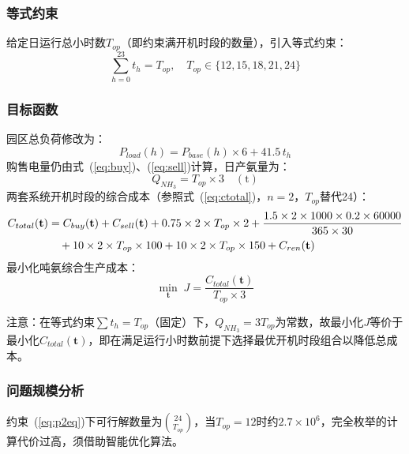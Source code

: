 \documentclass[UTF8,12pt,a4paper]{ctexart}
\begin{document}
\subsubsection{等式约束}

给定日运行总小时数$T_{op}$（即约束满开机时段的数量），引入等式约束：
\begin{equation}
  \sum_{h=0}^{23} t_h = T_{op},\quad T_{op}\in\{12,15,18,21,24\}
  \label{eq:p2eq}
\end{equation}

\subsubsection{目标函数}

园区总负荷修改为：
\begin{equation}
  P_{load}(h) = P_{base}(h)\times 6 + 41.5\,t_h
  \label{eq:load2}
\end{equation}
购售电量仍由式~(\ref{eq:buy})、(\ref{eq:sell})计算，日产氨量为：
\begin{equation}
  Q_{NH_3} = T_{op}\times 3 \quad(\text{t})
  \label{eq:qnh3}
\end{equation}
两套系统开机时段的综合成本（参照式~(\ref{eq:ctotal})，$n=2$，$T_{op}$替代24）：
\begin{align}
  C_{total}(\mathbf{t}) &= C_{buy}(\mathbf{t}) + C_{sell}(\mathbf{t})
    + 0.75\times2\times T_{op}\times2
    + \frac{1.5\times2\times1000\times0.2\times60000}{365\times30} \notag \\
    &\quad + 10\times2\times T_{op}\times100
    + 10\times2\times T_{op}\times150
    + C_{ren}(\mathbf{t})
  \label{eq:ctotal2}
\end{align}
最小化吨氨综合生产成本：
\begin{equation}
  \min_{\mathbf{t}}\; J = \frac{C_{total}(\mathbf{t})}{T_{op}\times 3}
  \label{eq:p2obj}
\end{equation}

注意：在等式约束$\sum t_h=T_{op}$（固定）下，$Q_{NH_3}=3T_{op}$为常数，故最小化$J$等价于最小化$C_{total}(\mathbf{t})$，即在满足运行小时数前提下选择最优开机时段组合以降低总成本。

\subsubsection{问题规模分析}

约束~(\ref{eq:p2eq})下可行解数量为$\binom{24}{T_{op}}$，当$T_{op}=12$时约$2.7\times10^6$，完全枚举的计算代价过高，须借助智能优化算法。
\end{document}
